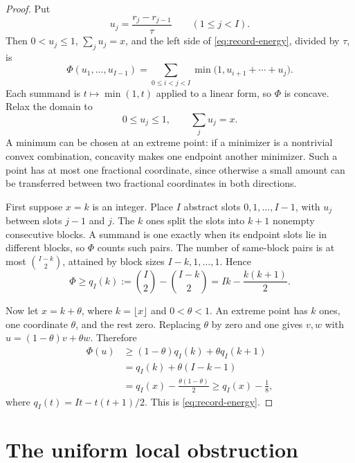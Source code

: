 \documentclass[11pt]{article}
\theoremstyle{definition}
\theoremstyle{remark}
\begin{document}
\begin{proof}
Put
\[
  u_j=\frac{r_j-r_{j-1}}{\tau}
  \qquad(1\le j<I).
\]
Then \(0<u_j\le1\), \(\sum_j u_j=x\), and the left side of
\eqref{eq:record-energy}, divided by \(\tau\), is
\[
  \Phi(u_1,\ldots,u_{I-1})
  =\sum_{0\le i<j<I}
   \min\bigl(1,u_{i+1}+\cdots+u_j\bigr).
\]
Each summand is \(t\mapsto\min(1,t)\) applied to a linear form, so
\(\Phi\) is concave.  Relax the domain to
\[
  0\le u_j\le1,
  \qquad \sum_j u_j=x.
\]
A minimum can be chosen at an extreme point: if a minimizer is a
nontrivial convex combination, concavity makes one endpoint another
minimizer.  Such a point has at most one fractional coordinate, since
otherwise a small amount can be transferred between two fractional
coordinates in both directions.

First suppose \(x=k\) is an integer.  Place \(I\) abstract slots
\(0,1,\ldots,I-1\), with \(u_j\) between slots \(j-1\) and \(j\).  The
\(k\) ones split the slots into \(k+1\) nonempty consecutive blocks.  A
summand is one exactly when its endpoint slots lie in different blocks,
so \(\Phi\) counts such pairs.  The number of same-block pairs is at most
\(\binom{I-k}{2}\), attained by block sizes \(I-k,1,\ldots,1\).  Hence
\[
  \Phi\ge q_I(k):=\binom I2-\binom{I-k}{2}
  =Ik-\frac{k(k+1)}2.
\]

Now let \(x=k+\theta\), where \(k=\lfloor x\rfloor\) and
\(0<\theta<1\).  An extreme point has \(k\) ones, one coordinate
\(\theta\), and the rest zero.  Replacing \(\theta\) by zero and one
gives \(v,w\) with \(u=(1-\theta)v+\theta w\).  Therefore
\[
\begin{aligned}
  \Phi(u)
  &\ge(1-\theta)q_I(k)+\theta q_I(k+1)\\
  &=q_I(k)+\theta(I-k-1)\\
  &=q_I(x)-\frac{\theta(1-\theta)}2
  \ge q_I(x)-\frac18,
\end{aligned}
\]
where \(q_I(t)=It-t(t+1)/2\).  This is \eqref{eq:record-energy}.
\end{proof}

\section{The uniform local obstruction}
\end{document}
